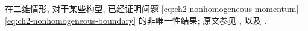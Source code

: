 \begin{Remark}
\label{rem:ch2-nonhomogeneous-nonuniqueness}
在二维情形, 对于某些构型, 已经证明问题 \eqref{eq:ch2-nonhomogeneous-momentum}--\eqref{eq:ch2-nonhomogeneous-boundary} 的非唯一性结果; 原文参见 ,  以及 .
\end{Remark}

